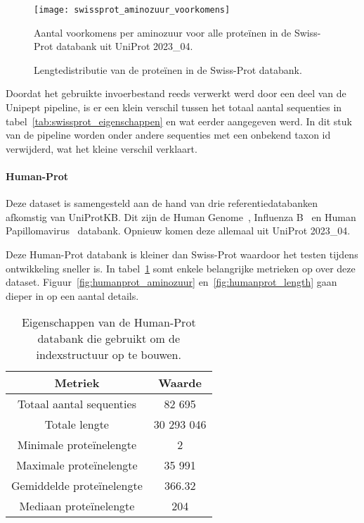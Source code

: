 \begin{figure}[H]
    \centering
    \texttt{[image: swissprot\_aminozuur\_voorkomens]}
    \caption{Aantal voorkomens per aminozuur voor alle proteïnen in de Swiss-Prot databank uit UniProt 2023\_04.}
    \label{fig:swissprot_aminozuur}
\end{figure}

\begin{figure}[H]
    \centering
    \hfill
    \caption{Lengtedistributie van de proteïnen in de Swiss-Prot databank.}\label{fig:swissprot_length}
\end{figure}

Doordat het gebruikte invoerbestand reeds verwerkt werd door een deel van de Unipept pipeline, is er een klein verschil tussen het totaal aantal sequenties in tabel~\ref{tab:swissprot_eigenschappen} en wat eerder aangegeven werd.
In dit stuk van de pipeline worden onder andere sequenties met een onbekend taxon id verwijderd, wat het kleine verschil verklaart.

\paragraph{Human-Prot} Deze dataset is samengesteld aan de hand van drie referentiedatabanken afkomstig van UniProtKB\@.
Dit zijn de Human Genome~\cite{proteomes_homo_sapiens}, Influenza B~\cite{proteomes_infuenza_b} en Human Papillomavirus~\cite{proteomes_human_papillomavirus} databank.
Opnieuw komen deze allemaal uit UniProt 2023\_04.

Deze Human-Prot databank is kleiner dan Swiss-Prot waardoor het testen tijdens ontwikkeling sneller is.
In tabel~\ref{tab:humanprot_eigenschappen} somt enkele belangrijke metrieken op over deze dataset.
Figuur~\ref{fig:humanprot_aminozuur} en~\ref{fig:humanprot_length} gaan dieper in op een aantal details.

\begin{table}[h!]
    \centering
    \begin{tabular}{ c c }
        Metriek                   & Waarde     \\
        \hline\hline
        Totaal aantal sequenties  & 82 695     \\
        Totale lengte             & 30 293 046 \\
        Minimale proteïnelengte   & 2          \\
        Maximale proteïnelengte   & 35 991     \\
        Gemiddelde proteïnelengte & 366.32     \\
        Mediaan proteïnelengte    & 204        \\
        \hline
    \end{tabular}
    \caption{Eigenschappen van de Human-Prot databank die gebruikt om de indexstructuur op te bouwen.}
    \label{tab:humanprot_eigenschappen}
\end{table}

